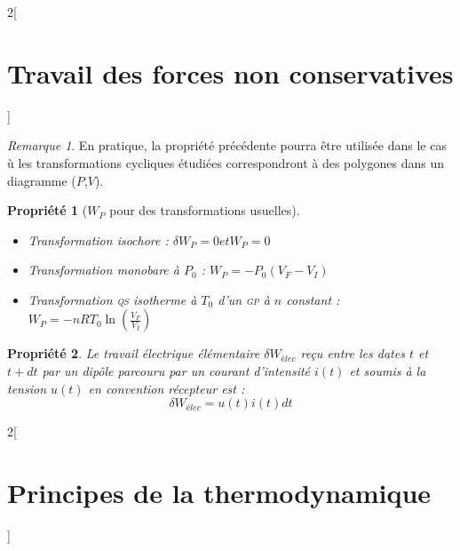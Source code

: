 \documentclass[french]{book}
\newtheorem*{propriete}{Propriété}
\theoremstyle{definition}
\theoremstyle{remark}
\newtheorem*{remarque}{Remarque}
\newcommand*{\abr}[1]{\textsc{#1}}
\newcommand{\cours}[2]
{\begin{landscape}
\begin{multicols*}{2}[\section{#1}]

\end{multicols*}
\end{landscape}}
\begin{document}
\begin{landscape}
\begin{multicols*}{2}[\section{Travail des forces non conservatives}]
\begin{remarque}

En pratique, la propriété précédente pourra être utilisée dans le cas ù les transformations cycliques étudiées correspondront à des polygones dans un diagramme ($P$,$V$).

\end{remarque}

\begin{propriete}[$W_P$ pour des transformations usuelles]

\begin{itemize}
\item Transformation isochore : $\delta W_P = 0 et W_P = 0$
\item Transformation monobare à $P_0$ : $W_P = -P_0(V_F - V_I)$
\item Transformation \abr{qs} isotherme à $T_0$ d'un \abr{gp} à $n$ constant : $W_P = -nRT_0\ln \left( \frac{V_F}{V_I} \right) $
\end{itemize}

\end{propriete}

\begin{propriete}

Le travail électrique élémentaire $\delta W_{élec}$ reçu entre les dates $t$ et $t + dt$ par un dipôle parcouru par un courant d'intensité $i(t)$ et soumis à la tension $u(t)$ en convention récepteur est :
\[
\delta W_{élec} = u(t)i(t)dt
\]

\end{propriete}

\end{multicols*}
\end{landscape}

\cours{Principes de la thermodynamique}{11_principes_thermodynamique}
\end{document}
